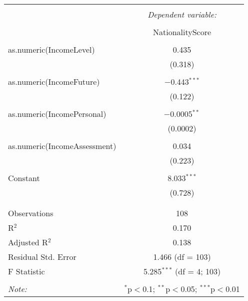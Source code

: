 \documentclass{article}
\begin{document}
\begin{table}[!htbp] \centering 
  \caption{} 
  \label{} 
\begin{tabular}{@{\extracolsep{5pt}}lc} 
\\[-1.8ex]\hline 
\hline \\[-1.8ex] 
 & \multicolumn{1}{c}{\textit{Dependent variable:}} \\ 
\cline{2-2} 
\\[-1.8ex] & NationalityScore \\ 
\hline \\[-1.8ex] 
 as.numeric(IncomeLevel) & 0.435 \\ 
  & (0.318) \\ 
  & \\ 
 as.numeric(IncomeFuture) & $-$0.443$^{***}$ \\ 
  & (0.122) \\ 
  & \\ 
 as.numeric(IncomePersonal) & $-$0.0005$^{**}$ \\ 
  & (0.0002) \\ 
  & \\ 
 as.numeric(IncomeAssessment) & 0.034 \\ 
  & (0.223) \\ 
  & \\ 
 Constant & 8.033$^{***}$ \\ 
  & (0.728) \\ 
  & \\ 
\hline \\[-1.8ex] 
Observations & 108 \\ 
R$^{2}$ & 0.170 \\ 
Adjusted R$^{2}$ & 0.138 \\ 
Residual Std. Error & 1.466 (df = 103) \\ 
F Statistic & 5.285$^{***}$ (df = 4; 103) \\ 
\hline 
\hline \\[-1.8ex] 
\textit{Note:}  & \multicolumn{1}{r}{$^{*}$p$<$0.1; $^{**}$p$<$0.05; $^{***}$p$<$0.01} \\ 
\end{tabular} 
\end{table} 
\end{document}
